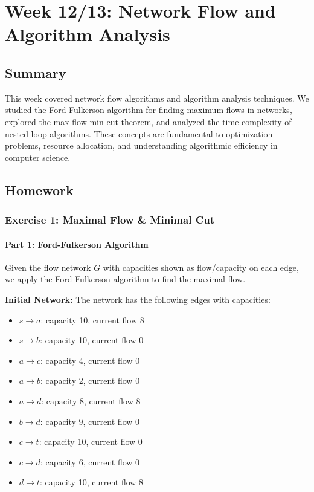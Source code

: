 \documentclass{article}
\begin{document}
\newpage

\section{Week 12/13: Network Flow and Algorithm Analysis}

\subsection{Summary}
This week covered network flow algorithms and algorithm analysis techniques. We studied the Ford-Fulkerson algorithm for finding maximum flows in networks, explored the max-flow min-cut theorem, and analyzed the time complexity of nested loop algorithms. These concepts are fundamental to optimization problems, resource allocation, and understanding algorithmic efficiency in computer science.

\subsection{Homework}

\subsubsection{Exercise 1: Maximal Flow \& Minimal Cut}

\paragraph{Part 1: Ford-Fulkerson Algorithm}

Given the flow network $G$ with capacities shown as flow/capacity on each edge, we apply the Ford-Fulkerson algorithm to find the maximal flow.

\textbf{Initial Network:}
The network has the following edges with capacities:
\begin{itemize}
    \item $s \to a$: capacity 10, current flow 8
    \item $s \to b$: capacity 10, current flow 0
    \item $a \to c$: capacity 4, current flow 0
    \item $a \to b$: capacity 2, current flow 0
    \item $a \to d$: capacity 8, current flow 8
    \item $b \to d$: capacity 9, current flow 0
    \item $c \to t$: capacity 10, current flow 0
    \item $c \to d$: capacity 6, current flow 0
    \item $d \to t$: capacity 10, current flow 8
\end{itemize}
\end{document}
